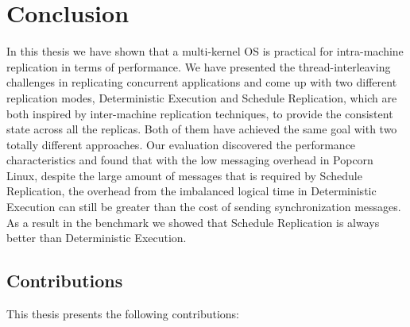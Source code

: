 \chapter{Conclusion}

In this thesis we have shown that a multi-kernel OS is practical for intra-machine replication in terms of performance. We have presented the thread-interleaving challenges in replicating concurrent applications and come up with two different replication modes, Deterministic Execution and Schedule Replication, which are both inspired by inter-machine replication techniques, to provide the consistent state across all the replicas. Both of them have achieved the same goal with two totally different approaches. Our evaluation discovered the performance characteristics and found that with the low messaging overhead in Popcorn Linux, despite the large amount of messages that is required by Schedule Replication, the overhead from the imbalanced logical time in Deterministic Execution can still be greater than the cost of sending synchronization messages. As a result in the benchmark we showed that Schedule Replication is always better than Deterministic Execution.

\section{Contributions}
This thesis presents the following contributions:

